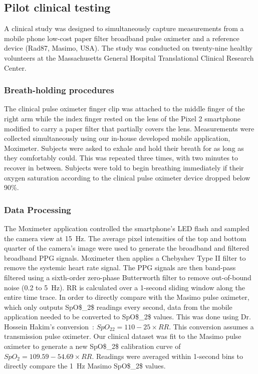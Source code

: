 \subsection{Pilot clinical testing}
A clinical study was designed to simultaneously capture measurements from a mobile phone low-cost paper filter broadband pulse oximeter and a reference device (Rad87, Masimo, USA). The study was conducted on twenty-nine healthy volunteers at the Massachusetts General Hospital Translational Clinical Research Center. 
    
\subsubsection{Breath-holding procedures}
The clinical pulse oximeter finger clip was attached to the middle finger of the right arm while the index finger rested on the lens of the Pixel 2 smartphone modified to carry a paper filter that partially covers the lens. Measurements were collected simultaneously using our in-house developed mobile application, Moximeter. Subjects were asked to exhale and hold their breath for as long as they comfortably could. This was repeated three times, with two minutes to recover in between. Subjects were told to begin breathing immediately if their oxygen saturation according to the clinical pulse oximeter device dropped below 90\%. 

\subsubsection{Data Processing}
The Moximeter application controlled the smartphone's \ac{LED} flash and sampled the camera view at 15~Hz. The average pixel intensities of the top and bottom quarter of the camera's image were used to generate the broadband and filtered broadband \ac{PPG} signals. Moximeter then applies a Chebyshev Type II filter to remove the systemic heart rate signal. The \ac{PPG} signals are then band-pass filtered using a sixth-order zero-phase Butterworth filter to remove out-of-bound noise (0.2 to 5~Hz). \ac{RR} is calculated over a 1-second sliding window along the entire time trace. In order to directly compare with the Masimo pulse oximeter, which only outputs \ac{SpO$_2$} readings every second, data from the mobile application needed to be converted to \ac{SpO$_2$} values. This was done using Dr. Hossein Hakim’s conversion~\cite{Bailey2008}: $SpO_22 = 110 - 25\times RR$. This conversion assumes a transmission pulse oximeter. Our clinical dataset was fit to the Masimo pulse oximeter to generate a new \ac{SpO$_2$} calibration curve of $SpO_2 = 109.59 - 54.69\times RR$. Readings were averaged within 1-second bins to directly compare the 1~Hz Masimo \ac{SpO$_2$} values. 
        
